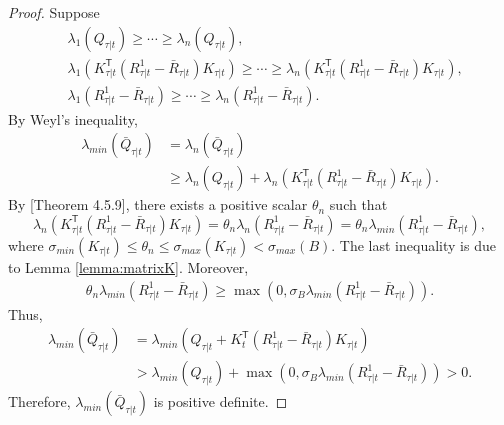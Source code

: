 \documentclass{article}
\newcommand{\transpose}{\mathsf{T}}
\begin{document}
\begin{proof}
    Suppose
    \begin{align*}
        &\lambda_{1}(Q_{\tau|t}) \geq \cdots \geq \lambda_{n}(Q_{\tau|t}),\\
        &\lambda_{1}(K_{\tau|t}^{\transpose}(R_{\tau|t}^{1} - \bar{R}_{\tau|t})K_{\tau|t}) \geq \cdots \geq \lambda_{n}(K_{\tau|t}^{\transpose}(R_{\tau|t}^{1} - \bar{R}_{\tau|t})K_{\tau|t}),\\
        &\lambda_{1}(R_{\tau|t}^{1} - \bar{R}_{\tau|t}) \geq \cdots \geq \lambda_{n}(R_{\tau|t}^{1} - \bar{R}_{\tau|t}).
    \end{align*}
    By Weyl's inequality,
    \begin{align*}
        \lambda_{min}(\bar{Q}_{\tau|t}) &= \lambda_{n}(\bar{Q}_{\tau|t})\\
        &\geq \lambda_{n}(Q_{\tau|t}) + \lambda_{n}(K_{\tau|t}^{\transpose}(R_{\tau|t}^{1} - \bar{R}_{\tau|t})K_{\tau|t}).
    \end{align*}
    By \cite{horn_matrix_2013}[Theorem 4.5.9], there exists a positive scalar $\theta_{n}$ such that
    \begin{equation}
        \lambda_{n}(K_{\tau|t}^{\transpose}(R_{\tau|t}^{1} - \bar{R}_{\tau|t})K_{\tau|t}) = \theta_{n}\lambda_{n}(R_{\tau|t}^{1} - \bar{R}_{\tau|t}) = \theta_{n}\lambda_{min}(R_{\tau|t}^{1} - \bar{R}_{\tau|t}),
    \end{equation}
    where $\sigma_{min}(K_{\tau|t}) \leq \theta_{n} \leq \sigma_{max}(K_{\tau|t}) < \sigma_{max}(B)$.
    The last inequality is due to Lemma \ref{lemma:matrixK}. Moreover,
    \begin{align*}
        \theta_{n}\lambda_{min}(R_{\tau|t}^{1} - \bar{R}_{\tau|t}) \geq \max(0,\sigma_{B}\lambda_{min}(R_{\tau|t}^{1} - \bar{R}_{\tau|t})).
    \end{align*}
    Thus, 
    \begin{align*}
        \lambda_{min}(\bar{Q}_{\tau|t}) &= \lambda_{min}(Q_{\tau|t}+K_{t}^{\transpose}(R_{\tau|t}^{1}-\bar{R}_{\tau|t})K_{\tau|t}) \\
        &> \lambda_{min}(Q_{\tau|t}) +\max(0,\sigma_{B}\lambda_{min}(R_{\tau|t}^{1} - \bar{R}_{\tau|t})) > 0.
    \end{align*}
    Therefore, $\lambda_{min}(\bar{Q}_{\tau|t})$ is positive definite.
\end{proof}
\end{document}
